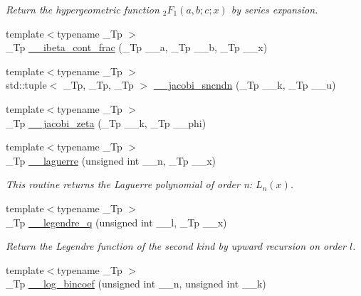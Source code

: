 \begin{DoxyCompactItemize}
\begin{DoxyCompactList}\small\item\em Return the hypergeometric function $ _2F_1(a,b;c;x) $ by series expansion. \end{DoxyCompactList}\item 
{\footnotesize template$<$typename \+\_\+\+Tp $>$ }\\\+\_\+\+Tp \hyperlink{namespacestd_1_1____detail_a96a5a5205553de07f98b89b2e1f18000}{\+\_\+\+\_\+ibeta\+\_\+cont\+\_\+frac} (\+\_\+\+Tp \+\_\+\+\_\+a, \+\_\+\+Tp \+\_\+\+\_\+b, \+\_\+\+Tp \+\_\+\+\_\+x)
\item 
{\footnotesize template$<$typename \+\_\+\+Tp $>$ }\\std\+::tuple$<$ \+\_\+\+Tp, \+\_\+\+Tp, \+\_\+\+Tp $>$ \hyperlink{namespacestd_1_1____detail_a98915d9bbc58112db7ffef2753313a63}{\+\_\+\+\_\+jacobi\+\_\+sncndn} (\+\_\+\+Tp \+\_\+\+\_\+k, \+\_\+\+Tp \+\_\+\+\_\+u)
\item 
{\footnotesize template$<$typename \+\_\+\+Tp $>$ }\\\+\_\+\+Tp \hyperlink{namespacestd_1_1____detail_a1d5fc69202703d72974c4370fd7ade03}{\+\_\+\+\_\+jacobi\+\_\+zeta} (\+\_\+\+Tp \+\_\+\+\_\+k, \+\_\+\+Tp \+\_\+\+\_\+phi)
\item 
{\footnotesize template$<$typename \+\_\+\+Tp $>$ }\\\+\_\+\+Tp \hyperlink{namespacestd_1_1____detail_aa714c4983a3cb7d9d18e0c2c5a8f6826}{\+\_\+\+\_\+laguerre} (unsigned int \+\_\+\+\_\+n, \+\_\+\+Tp \+\_\+\+\_\+x)
\begin{DoxyCompactList}\small\item\em This routine returns the Laguerre polynomial of order n\+: $ L_n(x) $. \end{DoxyCompactList}\item 
{\footnotesize template$<$typename \+\_\+\+Tp $>$ }\\\+\_\+\+Tp \hyperlink{namespacestd_1_1____detail_a0643760e0d1701df4db880b2ad969055}{\+\_\+\+\_\+legendre\+\_\+q} (unsigned int \+\_\+\+\_\+l, \+\_\+\+Tp \+\_\+\+\_\+x)
\begin{DoxyCompactList}\small\item\em Return the Legendre function of the second kind by upward recursion on order $ l $. \end{DoxyCompactList}\item 
{\footnotesize template$<$typename \+\_\+\+Tp $>$ }\\\+\_\+\+Tp \hyperlink{namespacestd_1_1____detail_a152324942f37ae3c6fc65aec1f17049e}{\+\_\+\+\_\+log\+\_\+bincoef} (unsigned int \+\_\+\+\_\+n, unsigned int \+\_\+\+\_\+k)

\end{DoxyCompactItemize}
